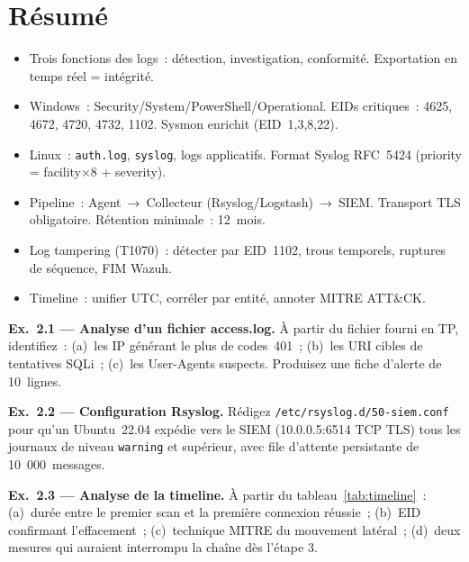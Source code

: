 \section*{Résumé}

\begin{boxresume}
\begin{itemize}
  \item Trois fonctions des logs~: détection, investigation, conformité.
        Exportation en temps réel = intégrité.
  \item Windows~: Security/System/PowerShell/Operational. EIDs critiques~:
        4625, 4672, 4720, 4732, 1102. Sysmon enrichit (EID~1,3,8,22).
  \item Linux~: \texttt{auth.log}, \texttt{syslog}, logs applicatifs.
        Format Syslog RFC~5424 (priority = facility×8 + severity).
  \item Pipeline~: Agent~→~Collecteur (Rsyslog/Logstash)~→~SIEM.
        Transport TLS obligatoire. Rétention minimale~: 12~mois.
  \item Log tampering (T1070)~: détecter par EID~1102, trous temporels,
        ruptures de séquence, FIM Wazuh.
  \item Timeline~: unifier UTC, corréler par entité, annoter MITRE ATT\&CK.
\end{itemize}
\end{boxresume}

\begin{boxexo}
\textbf{Ex.~2.1 — Analyse d'un fichier access.log.}
À partir du fichier fourni en TP, identifiez~: (a)~les IP générant le
plus de codes~401~; (b)~les URI cibles de tentatives SQLi~;
(c)~les User-Agents suspects. Produisez une fiche d'alerte de 10~lignes.

\medskip\textbf{Ex.~2.2 — Configuration Rsyslog.}
Rédigez \texttt{/etc/rsyslog.d/50-siem.conf} pour qu'un Ubuntu~22.04
expédie vers le SIEM (10.0.0.5:6514 TCP TLS) tous les journaux de
niveau \texttt{warning} et supérieur, avec file d'attente persistante
de 10~000~messages.

\medskip\textbf{Ex.~2.3 — Analyse de la timeline.}
À partir du tableau~\ref{tab:timeline}~: (a)~durée entre le premier
scan et la première connexion réussie~; (b)~EID confirmant l'effacement~;
(c)~technique MITRE du mouvement latéral~; (d)~deux mesures qui auraient
interrompu la chaîne dès l'étape 3.
\end{boxexo}
